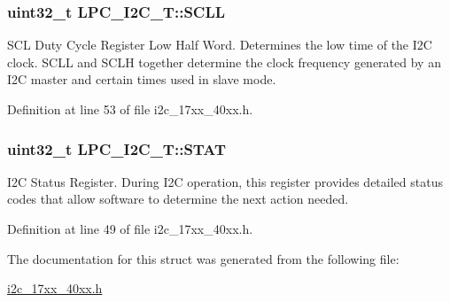 \subsubsection[{\texorpdfstring{S\+C\+LL}{SCLL}}]{ uint32\+\_\+t L\+P\+C\+\_\+\+I2\+C\+\_\+\+T\+::\+S\+C\+LL}\hypertarget{structLPC__I2C__T_a1cd0d0f95f90d6e6c3380f112144085b}{}\label{structLPC__I2C__T_a1cd0d0f95f90d6e6c3380f112144085b}
S\+CL Duty Cycle Register Low Half Word. Determines the low time of the I2C clock. S\+C\+LL and S\+C\+LH together determine the clock frequency generated by an I2C master and certain times used in slave mode. 

Definition at line 53 of file i2c\+\_\+17xx\+\_\+40xx.\+h.

\subsubsection[{\texorpdfstring{S\+T\+AT}{STAT}}]{ uint32\+\_\+t L\+P\+C\+\_\+\+I2\+C\+\_\+\+T\+::\+S\+T\+AT}\hypertarget{structLPC__I2C__T_ae806722ff38a93680338e5607d96156d}{}\label{structLPC__I2C__T_ae806722ff38a93680338e5607d96156d}
I2C Status Register. During I2C operation, this register provides detailed status codes that allow software to determine the next action needed. 

Definition at line 49 of file i2c\+\_\+17xx\+\_\+40xx.\+h.



The documentation for this struct was generated from the following file\+:\begin{DoxyCompactItemize}
\item 
\hyperlink{i2c__17xx__40xx_8h}{i2c\+\_\+17xx\+\_\+40xx.\+h}\end{DoxyCompactItemize}
